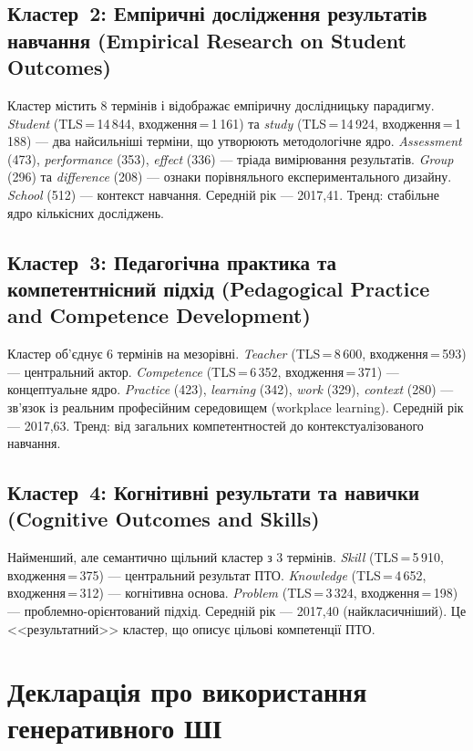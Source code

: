 \subsection*{Кластер~2: Емпіричні дослідження результатів навчання (Empirical Research on Student Outcomes)}

Кластер містить 8 термінів і відображає емпіричну дослідницьку парадигму. \textit{Student} (TLS\,=\,14\,844, входження\,=\,1\,161) та \textit{study} (TLS\,=\,14\,924, входження\,=\,1\,188) --- два найсильніші терміни, що утворюють методологічне ядро. \textit{Assessment} (473), \textit{performance} (353), \textit{effect} (336) --- тріада вимірювання результатів. \textit{Group} (296) та \textit{difference} (208) --- ознаки порівняльного експериментального дизайну. \textit{School} (512) --- контекст навчання. Середній рік --- 2017,41. Тренд: стабільне ядро кількісних досліджень.

\subsection*{Кластер~3: Педагогічна практика та компетентнісний підхід (Pedagogical Practice and Competence Development)}

Кластер об'єднує 6 термінів на мезорівні. \textit{Teacher} (TLS\,=\,8\,600, входження\,=\,593) --- центральний актор. \textit{Competence} (TLS\,=\,6\,352, входження\,=\,371) --- концептуальне ядро. \textit{Practice} (423), \textit{learning} (342), \textit{work} (329), \textit{context} (280) --- зв'язок із реальним професійним середовищем (workplace learning). Середній рік --- 2017,63. Тренд: від загальних компетентностей до контекстуалізованого навчання.

\subsection*{Кластер~4: Когнітивні результати та навички (Cognitive Outcomes and Skills)}

Найменший, але семантично щільний кластер з 3 термінів. \textit{Skill} (TLS\,=\,5\,910, входження\,=\,375) --- центральний результат ПТО. \textit{Knowledge} (TLS\,=\,4\,652, входження\,=\,312) --- когнітивна основа. \textit{Problem} (TLS\,=\,3\,324, входження\,=\,198) --- проблемно-орієнтований підхід. Середній рік --- 2017,40 (найкласичніший). Це <<результатний>> кластер, що описує цільові компетенції ПТО.


\section{Декларація про використання генеративного ШІ}
\label{app:genai}

